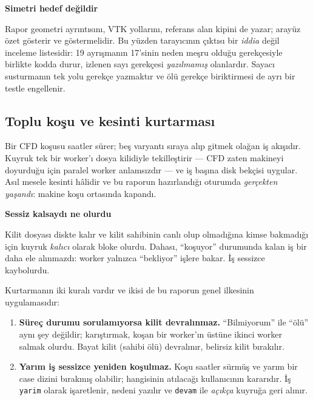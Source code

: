 \documentclass[11pt,a4paper]{article}
\newcommand{\kkkenar}{lacivert}
\newcommand{\kkzemin}{kod}
\newenvironment{renkkutu}[3]{%
  \renewcommand{\kkkenar}{#1}\renewcommand{\kkzemin}{#2}%
  \par\medskip\noindent
  \begin{lrbox}{\kutugovde}%
  \begin{minipage}{\dimexpr\linewidth-2\fboxsep-2\fboxrule\relax}\footnotesize
  \textcolor{#1}{\textbf{#3}}\par\vspace{3pt}%
}{%
  \end{minipage}%
  \end{lrbox}%
  \noindent\fcolorbox{\kkkenar}{\kkzemin}{\usebox{\kutugovde}}%
  \par\medskip
}
\newenvironment{reddedilir}[1]{\begin{renkkutu}{kotu}{kotubg}{#1}}{\end{renkkutu}}
\newenvironment{anafikir}[1]{\begin{renkkutu}{lacivert}{kod}{#1}}{\end{renkkutu}}
\begin{document}
\begin{anafikir}{Simetri hedef değildir}
Rapor geometri ayrıntısını, VTK yollarını, referans alan kipini de yazar;
arayüz özet gösterir ve göstermelidir. Bu yüzden tarayıcının çıktısı bir
\emph{iddia} değil inceleme listesidir: 19 ayrışmanın 17'sinin neden meşru
olduğu gerekçesiyle birlikte kodda durur, izlenen sayı gerekçesi
\emph{yazılmamış} olanlardır. Sayacı susturmanın tek yolu gerekçe yazmaktır ve
ölü gerekçe biriktirmesi de ayrı bir testle engellenir.
\end{anafikir}

\subsection{Toplu koşu ve kesinti kurtarması}

Bir CFD koşusu saatler sürer; beş varyantı sıraya alıp gitmek olağan iş
akışıdır. Kuyruk tek bir worker'ı dosya kilidiyle tekilleştirir --- CFD zaten
makineyi doyurduğu için paralel worker anlamsızdır --- ve iş başına disk
bekçisi uygular. Asıl mesele kesinti hâlidir ve bu raporun hazırlandığı oturumda
\emph{gerçekten yaşandı}: makine koşu ortasında kapandı.

\begin{reddedilir}{Sessiz kalsaydı ne olurdu}
Kilit dosyası diskte kalır ve kilit sahibinin canlı olup olmadığına kimse
bakmadığı için kuyruk \emph{kalıcı} olarak bloke olurdu. Dahası, ``koşuyor''
durumunda kalan iş bir daha ele alınmazdı: worker yalnızca ``bekliyor'' işlere
bakar. İş sessizce kaybolurdu.
\end{reddedilir}

Kurtarmanın iki kuralı vardır ve ikisi de bu raporun genel ilkesinin
uygulamasıdır:

\begin{enumerate}\setlength\itemsep{1pt}
  \item \textbf{Süreç durumu sorulamıyorsa kilit devralınmaz.}
        ``Bilmiyorum'' ile ``ölü'' aynı şey değildir; karıştırmak, koşan bir
        worker'ın üstüne ikinci worker salmak olurdu. Bayat kilit
        (sahibi ölü) devralınır, belirsiz kilit bırakılır.
  \item \textbf{Yarım iş sessizce yeniden koşulmaz.} Koşu saatler sürmüş ve
        yarım bir case dizini bırakmış olabilir; hangisinin atılacağı
        kullanıcının kararıdır. İş \texttt{yarim} olarak işaretlenir, nedeni
        yazılır ve \texttt{devam} ile \emph{açıkça} kuyruğa geri alınır.
\end{enumerate}
\end{document}
